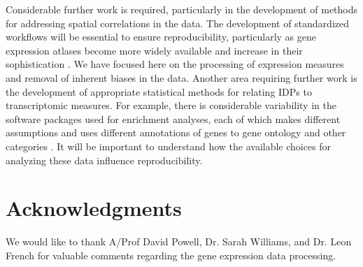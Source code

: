 Considerable further work is required, particularly in the development of methods for addressing spatial correlations in the data. The development of standardized workflows will be essential to ensure reproducibility, particularly as gene expression atlases become more widely available and increase in their sophistication \citep{Lein2007a,Harris2010,Miller2014}. We have focused here on the processing of expression measures and removal of inherent biases in the data. Another area requiring further work is the development of appropriate statistical methods for relating IDPs to transcriptomic measures. For example, there is considerable variability in the software packages used for enrichment analyses, each of which makes different assumptions and uses different annotations of genes to gene ontology and other categories \citep{Rhee2008}. It will be important to understand how the available choices for analyzing these data influence reproducibility. 

\section*{Acknowledgments}

We would like to thank A/Prof David Powell, Dr. Sarah Williams, and Dr. Leon French for valuable comments regarding the gene expression data processing.
